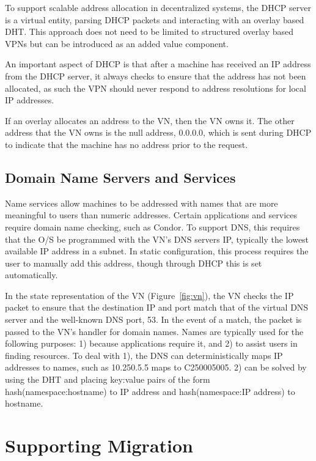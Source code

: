To support scalable address allocation in decentralized systems, the
DHCP server is a virtual entity, parsing DHCP packets and interacting with
an overlay based DHT.  This approach does not need to be limited to structured
overlay based VPNs but can be introduced as an added value component.

An important aspect of DHCP is that after a machine has received an IP address
from the DHCP server, it always checks to ensure that the address has not been
allocated, as such the VPN should never respond to address resolutions for
local IP addresses.

If an overlay allocates an address to the VN, then the VN owns it.  The other
address that the VN owns is the null address, 0.0.0.0, which is sent during
DHCP to indicate that the machine has no address prior to the request.

\subsection{Domain Name Servers and Services}

Name services allow machines to be addressed with names that are more
meaningful to users than numeric addresses.  Certain applications and services
require domain name checking, such as Condor.  To support DNS, this requires
that the O/S be programmed with the VN's DNS servers IP, typically the lowest
available IP address in a subnet.  In static configuration, this process
requires the user to manually add this address, though through DHCP this is set
automatically.

In the state representation of the VN (Figure~\ref{fig:vn}), the VN checks the
IP packet to ensure that the destination IP and port match that of the virtual
DNS server and the well-known DNS port, 53.  In the event of a match, the
packet is passed to the VN's handler for domain names.  Names are typically
used for the following purposes: 1) because applications require it, and 2) to
assist users in finding resources.  To deal with 1), the DNS can
deterministically maps IP addresses to names, such as 10.250.5.5 maps to
C250005005.  2) can be solved by using the DHT and placing key:value pairs of
the form hash(namespace:hostname) to IP address and hash(namespace:IP address)
to hostname.

\section{Supporting Migration}

